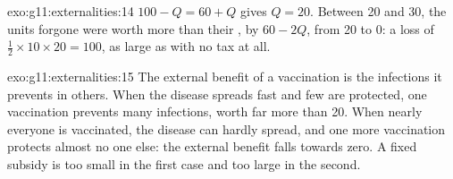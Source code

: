 \begin{solution}{exo:g11:externalities:14}
$100 - Q = 60 + Q$ gives $Q = 20$. Between 20 and 30, the units forgone were worth more than their , by $60 - 2Q$, from 20 to 0: a loss of $\tfrac12 \times 10 \times 20
= 100$, as large as with no tax at all.
\end{solution}

\begin{solution}{exo:g11:externalities:15}
The external benefit of a vaccination is the infections it prevents in others. When the disease spreads fast and few are protected, one vaccination prevents many infections,
worth far more than 20. When nearly everyone is vaccinated, the disease can hardly spread, and one more vaccination protects almost no one else: the external benefit falls
towards zero. A fixed subsidy is too small in the first case and too large in the second.
\end{solution}

